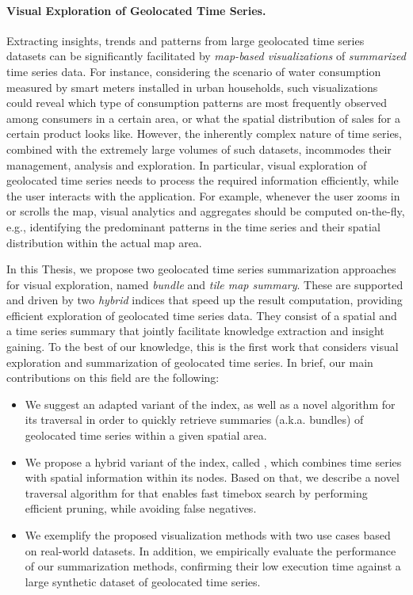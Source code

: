 \paragraph{Visual Exploration of Geolocated Time Series.} Extracting insights, trends and patterns from large geolocated time series datasets can be significantly facilitated by \textit{map-based visualizations} of \textit{summarized} time series data. For instance, considering the scenario of water consumption measured by smart meters installed in urban households, such visualizations could reveal which type of consumption patterns are most frequently observed among consumers in a certain area, or what the spatial distribution of sales for a certain product looks like. However, the inherently complex nature of time series, combined with the extremely large volumes of such datasets, incommodes their management, analysis and exploration. In particular, visual exploration of geolocated time series needs to process the required information efficiently, while the user interacts with the application. For example, whenever the user zooms in or scrolls the map, visual analytics and aggregates should be computed on-the-fly, e.g., identifying the predominant patterns in the time series and their spatial distribution within the actual map area.

In this Thesis, we propose two geolocated time series summarization approaches for visual exploration, named \textit{bundle} and \textit{tile map summary}. These are supported and driven by two \textit{hybrid} indices that speed up the result computation, providing efficient exploration of geolocated time series data. They consist of a spatial and a time series summary that jointly facilitate knowledge extraction and insight gaining. To the best of our knowledge, this is the first work that considers visual exploration and summarization of geolocated time series. In brief, our main contributions on this field are the following:

\begin{itemize}
 \item We suggest an adapted variant of the \btsr index, as well as a novel algorithm for its traversal in order to quickly retrieve summaries (a.k.a. bundles) of geolocated time series within a given spatial area.
 \item We propose a hybrid variant of the \isax index, called \hisax, which combines time series with spatial information within its nodes. Based on that, we describe a novel traversal algorithm for \hisax that enables fast timebox search by performing efficient pruning, while avoiding false negatives.
 \item We exemplify the proposed visualization methods with two use cases based on real-world datasets. In addition, we empirically evaluate the performance of our summarization methods, confirming their low execution time against a large synthetic dataset of geolocated time series.
\end{itemize}

